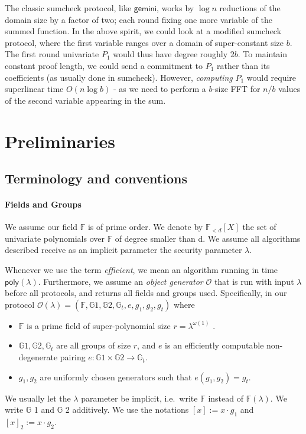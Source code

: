 \documentclass[11pt]{article} %
\newcommand{\gemini}{\ensuremath{\mathsf{gemini}}\xspace}
\newcommand{\G}{\ensuremath{{\mathbb G}}\xspace}
\newcommand{\Gt}{\ensuremath{{\mathbb G}_t}\xspace}
\newcommand{\F}{\ensuremath{\mathbb F}\xspace}
\newcommand{\defeq}{:=}
\newcommand{\enc}[1]{\ensuremath{\left[#1\right]}\xspace}
\newcommand{\enctwo}[1]{\ensuremath{\left[#1\right]_2}\xspace}
\newcommand{\polysofdeg}[1]{\ensuremath{\F_{< #1}[X]}\xspace}
\newcommand{\obgen}{\ensuremath{\mathcal O}\xspace}
\newcommand{\poly}{\ensuremath{\mathsf{poly(\lambda)}}\xspace}
\begin{document}
The classic sumcheck protocol, like \gemini, works by $\log n$ reductions of the domain size by a factor of two; each round fixing one more variable of the summed function. In the above spirit, we could look at a modified sumcheck protocol, where the first variable ranges over a domain of super-constant size $b$. The first round univariate $P_1$ would thus have degree roughly $2b$. 
To maintain constant proof length, we could send a commitment to $P_1$ rather than its coefficients (as usually done in sumcheck).
However, \emph{computing} $P_1$ would require superlinear time  $O(n \log b)$ - as we need to perform a $b$-size FFT for $n/b$ values of the second variable appearing in the sum. 


\section{Preliminaries}
\subsection{Terminology and conventions}\label{sec:terminology}
\paragraph{Fields and Groups}
We assume our field \F is of prime order.
We denote by \polysofdeg{d} the set of univariate polynomials over \F of degree smaller than d. 
We assume all algorithms described receive as an implicit parameter the security parameter $\lambda$.

Whenever we use the term \emph{efficient}, we mean an algorithm running in time \poly. Furthermore,
we assume an \emph{object generator} \obgen that is run with input $\lambda$ before all protocols, and returns all fields and groups used. Specifically, in our protocol $\obgen(\lambda) = (\F, \G1, \G2, \Gt, e, g_1, g_2,g_t)$ where
\begin{itemize}
\item \F is a prime field of super-polynomial size $r = \lambda^{\omega(1)}$
.
\item $\G1,\G2,\Gt$ are all groups of size $r$, and $e$ is an efficiently computable non-degenerate pairing
$e : \G1 \times \G2 \to \Gt$.
\item $g_1,g_2$ are uniformly chosen generators such that $e(g_1, g_2) = g_t$.
\end{itemize}
We usually let the $\lambda$ parameter be implicit, i.e.\ write \F instead of $\F(\lambda)$.
We write \G1 and \G2 additively. We use the notations $\enc{x}\defeq x\cdot g_1$ and $\enctwo{x}\defeq x\cdot g_2$.
\end{document}
